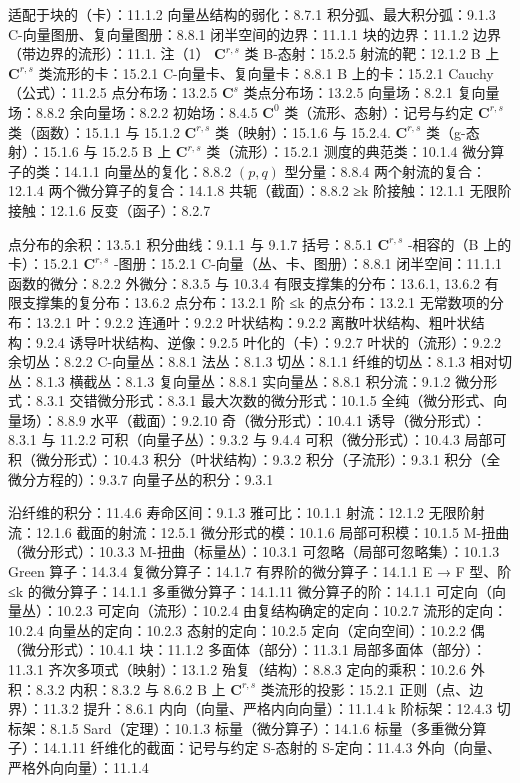 
适配于块的（卡）：11.1.2 向量丛结构的弱化：8.7.1 积分弧、最大积分弧：9.1.3 C-向量图册、复向量图册：8.8.1 闭半空间的边界：11.1.1 块的边界：11.1.2 边界（带边界的流形）：11.1. 注（1） \(\mathbf{C}^{r,s}\) 类 B-态射：15.2.5 射流的靶：12.1.2 B 上 \(\mathbf{C}^{r,s}\) 类流形的卡：15.2.1 C-向量卡、复向量卡：8.8.1 B 上的卡：15.2.1 Cauchy（公式）：11.2.5 点分布场：13.2.5 \(\mathbf{C}^s\) 类点分布场：13.2.5 向量场：8.2.1 复向量场：8.8.2 余向量场：8.2.2 初始场：8.4.5 \(\mathbf{C}^0\) 类（流形、态射）：记号与约定 \(\mathbf{C}^{r,s}\) 类（函数）：15.1.1 与 15.1.2 \(\mathbf{C}^{r,s}\) 类（映射）：15.1.6 与 15.2.4. \(\mathbf{C}^{r,s}\) 类（g-态射）：15.1.6 与 15.2.5 B 上 \(\mathbf{C}^{r,s}\) 类（流形）：15.2.1 测度的典范类：10.1.4 微分算子的类：14.1.1 向量丛的复化：8.8.2 \((p,q)\) 型分量：8.8.4 两个射流的复合：12.1.4 两个微分算子的复合：14.1.8 共轭（截面）：8.8.2 ≥k 阶接触：12.1.1 无限阶接触：12.1.6 反变（函子）：8.2.7

点分布的余积：13.5.1 积分曲线：9.1.1 与 9.1.7 括号：8.5.1 \(\mathbf{C}^{r,s}\) -相容的（B 上的卡）：15.2.1 \(\mathbf{C}^{r,s}\) -图册：15.2.1 C-向量（丛、卡、图册）：8.8.1 闭半空间：11.1.1 函数的微分：8.2.2 外微分：8.3.5 与 10.3.4 有限支撑集的分布：13.6.1, 13.6.2 有限支撑集的复分布：13.6.2 点分布：13.2.1 阶 ≤k 的点分布：13.2.1 无常数项的分布：13.2.1 叶：9.2.2 连通叶：9.2.2 叶状结构：9.2.2 离散叶状结构、粗叶状结构：9.2.4 诱导叶状结构、逆像：9.2.5 叶化的（卡）：9.2.7 叶状的（流形）：9.2.2 余切丛：8.2.2 C-向量丛：8.8.1 法丛：8.1.3 切丛：8.1.1 纤维的切丛：8.1.3 相对切丛：8.1.3 横截丛：8.1.3 复向量丛：8.8.1 实向量丛：8.8.1 积分流：9.1.2 微分形式：8.3.1 交错微分形式：8.3.1 最大次数的微分形式：10.1.5 全纯（微分形式、向量场）：8.8.9 水平（截面）：9.2.10 奇（微分形式）：10.4.1 诱导（微分形式）：8.3.1 与 11.2.2 可积（向量子丛）：9.3.2 与 9.4.4 可积（微分形式）：10.4.3 局部可积（微分形式）：10.4.3 积分（叶状结构）：9.3.2 积分（子流形）：9.3.1 积分（全微分方程的）：9.3.7 向量子丛的积分：9.3.1

沿纤维的积分：11.4.6 寿命区间：9.1.3 雅可比：10.1.1 射流：12.1.2 无限阶射流：12.1.6 截面的射流：12.5.1 微分形式的模：10.1.6 局部可积模：10.1.5 M-扭曲（微分形式）：10.3.3 M-扭曲（标量丛）：10.3.1 可忽略（局部可忽略集）：10.1.3 Green 算子：14.3.4 复微分算子：14.1.7 有界阶的微分算子：14.1.1 E → F 型、阶 ≤k 的微分算子：14.1.1 多重微分算子：14.1.11 微分算子的阶：14.1.1 可定向（向量丛）：10.2.3 可定向（流形）：10.2.4 由复结构确定的定向：10.2.7 流形的定向：10.2.4 向量丛的定向：10.2.3 态射的定向：10.2.5 定向（定向空间）：10.2.2 偶（微分形式）：10.4.1 块：11.1.2 多面体（部分）：11.3.1 局部多面体（部分）：11.3.1 齐次多项式（映射）：13.1.2 殆复（结构）：8.8.3 定向的乘积：10.2.6 外积：8.3.2 内积：8.3.2 与 8.6.2 B 上 \(\mathbf{C}^{r,s}\) 类流形的投影：15.2.1 正则（点、边界）：11.3.2 提升：8.6.1 内向（向量、严格内向向量）：11.1.4 k 阶标架：12.4.3 切标架：8.1.5 Sard（定理）：10.1.3 标量（微分算子）：14.1.6 标量（多重微分算子）：14.1.11 纤维化的截面：记号与约定 S-态射的 S-定向：11.4.3 外向（向量、严格外向向量）：11.1.4

